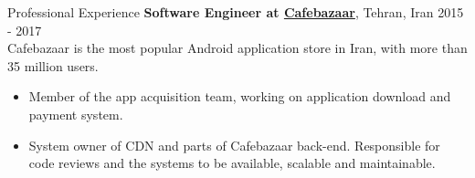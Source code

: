\documentclass{resume} %
\begin{document}
\begin{rSection}{Professional Experience}
	{\bf Software Engineer at \href{https://cafebazaar.ir/}{Cafebazaar}}, Tehran, Iran \hfill 2015 - 2017
	\smallskip
	\\ Cafebazaar is the most popular Android application store in Iran, with more than 35 million users.
	\vspace{-0.5em}
	\begin{itemize}[leftmargin=3mm]
		\setlength{\itemsep}{1pt}
		\setlength{\parskip}{0pt}
		\setlength{\parsep}{0pt}
		\renewcommand\labelitemi{$\cdot$}

		\item Member of the app acquisition team, working on application download and payment system.
		\item System owner of CDN and parts of Cafebazaar back-end. Responsible for code reviews and the systems to be available, scalable and maintainable.
	\end{itemize}
	
\end{rSection}

\end{document}
